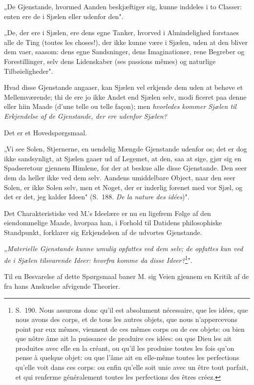 \documentclass[12pt,a4paper]{article}
\newcommand{\opage}[1]{\marginnote{\footnotesize\textit{[#1]}}}
\begin{document}
„De Gjenstande, hvormed Aanden beskjæftiger sig, kunne inddeles i to Classer:
enten ere de i Sjælen eller udenfor den".

„De, der ere i Sjælen, ere dens egne Tanker, hvorved i Almindelighed forstaaes
alle de Ting (toutes les choses!), der ikke kunne være i Sjælen, uden at den
bliver dem vaer, saasom: dens egne Sandsninger, dens Imaginationer, rene
Begreber og Forestillinger, selv dens Lidenskaber (ses passions mêmes) og
naturlige Tilbøieligheder".

Hvad disse Gjenstande angaaer, kan Sjælen vel erkjende dem uden at behøve et
Mellemværende; thi de ere jo ikke Andet end Sjælen selv, modi%
\opage{13}ficeret paa denne eller hiin Maade (d'une telle ou telle façon); men
\emph{hvorledes kommer Sjælen til Erkjendelse af de Gjenstande, der ere udenfor
Sjælen?}

Det er et Hovedspørgsmaal.

„Vi see Solen, Stjernerne, en uendelig Mængde Gjenstande udenfor os; det er dog
ikke sandsynligt, at Sjælen gaaer ud af Legemet, at den, saa at sige, gjør sig
en Spadseretour gjennem Himlene, for der at beskue alle disse Gjenstande. Den
seer dem da heller ikke ved dem selv. Aandens umiddelbare Object, naar den seer
Solen, er ikke Solen selv, men et Noget, der er inderlig forenet med vor Sjæl,
og det er det, jeg kalder Ideen" (S.~188. \emph{De la nature des idées})".

Det Charakteristiske ved M.'s Ideelære er nu en ligefrem Følge af den
eiendommelige Maade, hvorpaa han, i Forhold til Datidens philosophiske
Standpunkt, forklarer sig Erkjendelsen af de udvortes Gjenstande.

„\emph{Materielle Gjenstande kunne umulig opfattes ved dem selv; de opfattes kun
ved de i Sjælen tilsvarende Ideer: hvorfra komme da disse Ideer?}\footnote{S.~190.
Nous assurons donc qu'il est absolument nécessaire, que les idées, que nous avons
des corps, et de tous les autres objets, que nous n'appercevons point par eux
mêmes, viennent de ces mêmes corps ou de ces objets: ou bien que nôtre âme ait
la puissance de produire ces idées: ou que Dieu les ait produites avec elle en
la créant, ou qu'il les produise toutes les fois qu'on pense à quelque objet: ou
que l'âme ait en elle-même toutes les perfections qu'elle voit dans ces corps:
ou enfin qu'elle soit unie avec un être tout parfait, et qui renferme
généralement toutes les perfections des êtres créez.}".

Til en Besvarelse af dette Spørgsmaal baner M. sig Veien gjennem en Kritik af de
fra hans Anskuelse afvigende Theorier.
\end{document}
